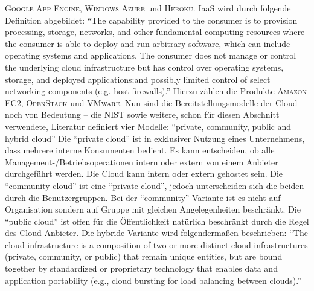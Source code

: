 \textsc{Google App Engine}, \textsc{Windows Azure} und \textsc{Heroku}.\autocite[vgl.][S.8]{kumar_reliability_2018} \ac{IaaS} wird durch folgende Definition abgebildet: \enquote{The capability provided to the consumer is to provision processing, storage, networks, and other fundamental computing resources where the consumer is able to deploy and run arbitrary software, which can include operating systems and applications. The consumer does not manage or control the underlying cloud infrastructure but has control over operating systems, storage, and deployed applications;and possibly limited control of select networking components (e.g. host firewalls).}\autocite[][S.3]{mell_nist_2011} Hierzu zählen die Produkte \textsc{Amazon EC2}, \textsc{OpenStack} und \textsc{VMware}. Nun sind die Bereitstellungsmodelle der Cloud noch von Bedeutung -- die \ac{NIST} sowie weitere, schon für diesen Abschnitt verwendete, Literatur definiert vier Modelle: \enquote{private, community, public and hybrid cloud} Die \enquote{private cloud} ist in exklusiver Nutzung eines Unternehmens, dass mehrere interne Konsumenten bedient. Es kann entscheiden, ob alle Management-/Betriebsoperationen intern oder extern von einem Anbieter durchgeführt werden. Die Cloud kann intern oder extern gehostet sein. Die \enquote{community cloud} ist eine \enquote{private cloud}, jedoch unterscheiden sich die beiden durch die Benutzergruppen. Bei der \enquote{community}-Variante ist es nicht auf Organisation sondern auf Gruppe mit gleichen Angelegenheiten beschränkt. Die \enquote{public cloud} ist offen für die Öffentlichkeit natürlich beschränkt durch die Regel des Cloud-Anbieter. Die hybride Variante wird folgendermaßen beschrieben: \enquote{The cloud infrastructure is a composition of two or more distinct cloud infrastructures (private, community, or public) that remain unique entities, but are bound together by standardized or proprietary technology that enables data and application portability (e.g., cloud bursting for load balancing between clouds).}\autocite[][S.3]{mell_nist_2011}


